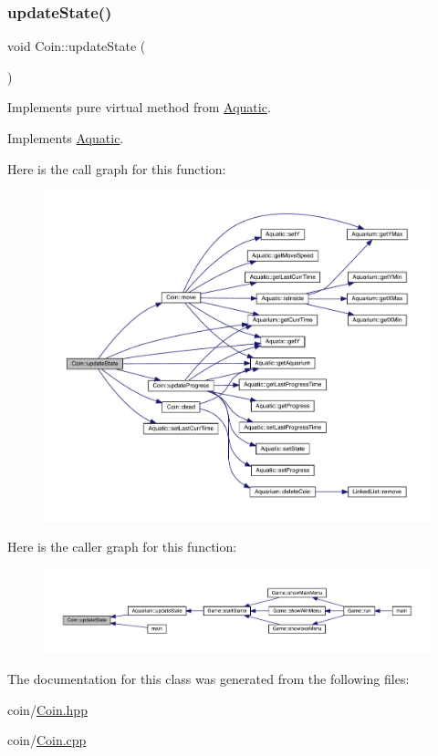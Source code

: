 \subsubsection{\texorpdfstring{update\+State()}{updateState()}}
{\footnotesize\ttfamily void Coin\+::update\+State (\begin{DoxyParamCaption}{ }\end{DoxyParamCaption})\hspace{0.3cm}{\ttfamily [virtual]}}



Implements pure virtual method from \mbox{\hyperlink{class_aquatic}{Aquatic}}. 



Implements \mbox{\hyperlink{class_aquatic_a51e44c95476d72a841fea667c6cbbedc}{Aquatic}}.

Here is the call graph for this function\+:\nopagebreak
\begin{figure}[H]
\begin{center}
\leavevmode
\includegraphics[width=350pt]{class_coin_ac9d03cbd68f9ccb739895832f77d60a3_cgraph}
\end{center}
\end{figure}
Here is the caller graph for this function\+:
\nopagebreak
\begin{figure}[H]
\begin{center}
\leavevmode
\includegraphics[width=350pt]{class_coin_ac9d03cbd68f9ccb739895832f77d60a3_icgraph}
\end{center}
\end{figure}


The documentation for this class was generated from the following files\+:\begin{DoxyCompactItemize}
\item 
coin/\mbox{\hyperlink{_coin_8hpp}{Coin.\+hpp}}\item 
coin/\mbox{\hyperlink{_coin_8cpp}{Coin.\+cpp}}\end{DoxyCompactItemize}
